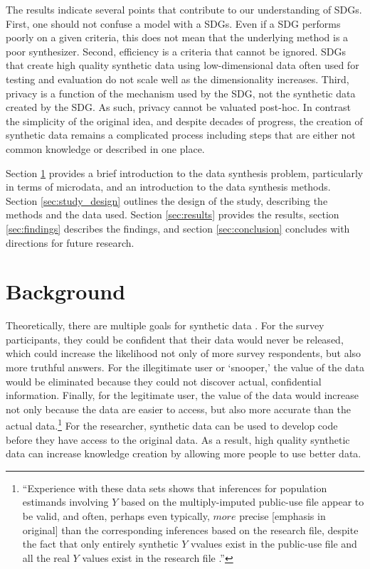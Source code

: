 \documentclass[runningheads]{llncs}
\begin{document}
The results indicate several points that contribute to our understanding of SDGs.  First, one should not confuse a model with a SDGs.  Even if a SDG performs poorly on a given criteria, this does not mean that the underlying method is a poor synthesizer.  Second, efficiency is a criteria that cannot be ignored.  SDGs that create high quality synthetic data using low-dimensional data often used for testing and evaluation do not scale well as the dimensionality increases.   Third, privacy is a function of the mechanism used by the SDG, not the synthetic data created by the SDG.  As such, privacy cannot be valuated post-hoc.  In contrast the simplicity of the original idea, and despite decades of progress, the creation of synthetic data remains a complicated process including steps that are either not common knowledge or described in one place.

Section \ref{sec:background} provides a brief introduction to the data synthesis problem, particularly in terms of microdata, and an introduction to the data synthesis methods. Section \ref{sec:study_design} outlines the design of the study, describing the methods and the data used. Section \ref{sec:results} provides the results, section \ref{sec:findings} describes the findings, and section \ref{sec:conclusion} concludes with directions for future research.

\section{Background}\label{sec:background}

Theoretically, there are multiple goals for synthetic data \cite{rubin1993statistical}.  For the survey participants, they could be confident that their data would never be released, which could increase the likelihood not only of more survey respondents, but also more truthful answers.  For the illegitimate user or `snooper,' the value of the data would be eliminated because they could not discover actual, confidential information.  Finally, for the legitimate user, the value of the data would increase not only because the data are easier to access, but also more accurate than the actual data.\footnote{``Experience with these data sets shows that inferences for population estimands involving $Y$ based on the multiply-imputed public-use file appear to be valid, and often, perhaps even typically, $more$ precise [emphasis in original] than the corresponding inferences based on the research file, despite the fact that only entirely synthetic $Y$ vvalues exist in the public-use file and all the real $Y$ values exist in the research file \cite[pg. 466]{rubin1993statistical}.''}  For the researcher, synthetic data can be used to develop code before they have access to the original data.  As a result, high quality synthetic data can increase knowledge creation by allowing more people to use better data. 
\end{document}

